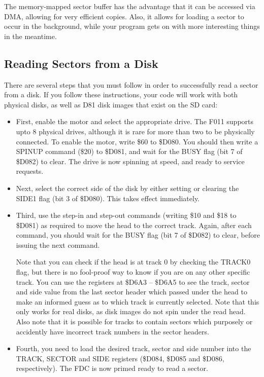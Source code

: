 The memory-mapped sector buffer has the advantage that it can be
accessed via DMA, allowing for very efficient copies.  Also, it allows
for loading a sector to occur in the background, while your program
gets on with more interesting things in the meantime.

\subsection{Reading Sectors from a Disk}

There are several steps that you must follow in order to successfully read
a sector from a disk. If you follow these instructions, your code will work
with both physical disks, as well as D81 disk images that exist on the SD
card:

\begin{itemize}
\item First, enable the motor and select the appropriate drive. The F011
  supports upto 8 physical drives, although it is rare for more than two
  to be physically connected.  To enable the motor, write \$60 to \$D080.
  You should then write a SPINUP command (\$20) to \$D081, and wait for
  the BUSY flag (bit 7 of \$D082) to clear.  The drive is now spinning
  at speed, and ready to service requests.
\item Next, select the correct side of the disk by either setting or clearing
  the SIDE1 flag (bit 3 of \$D080).  This takes effect immediately.
\item Third, use the step-in and step-out commands (writing \$10 and \$18 to
  \$D081) as required to move the head to the correct track. Again, after each
  command, you should wait for the BUSY flag (bit 7 of \$D082) to clear, before
  issuing the next command.

  Note that you can check if the head is at track 0
  by checking the TRACK0 flag, but there is no fool-proof way to know if you
  are on any other specific track.  You can use the registers at \$D6A3 --
  \$D6A5 to see the track, sector and side value from the last sector header
  which passed under the head to make an informed guess as to which track
  is currently selected. Note that this only works for real disks, as disk
  images do not spin under the read head. Also note that it is possible for
  tracks to contain sectors which purposely or accidently have incorrect
  track numbers in the sector headers.
  
  \item Fourth, you need to load the desired track, sector and
side number into the TRACK, SECTOR and SIDE registers (\$D084, \$D085
and \$D086, respectively). The FDC is now primed ready to read a sector.


\end{itemize}
